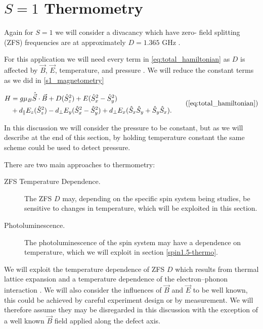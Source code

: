 \section{$S=1$ Thermometry}
Again for $S=1$ we will consider a divacancy which have zero-
field splitting (ZFS) frequencies are at approximately
$D = 1.365$ GHz \cite{Falk2013}.

For this application we will need every term in \eqref{eq:total_hamiltonian} as $D$ is affected by $\vec{B}$, $\vec{E}$, temperature, and pressure \cite{Fujiwara2021}. We will reduce the constant terms as we did in \ref{s1_magnetometry}

\begin{equation}
	\begin{align}
		H & = g \mu_B \hat{\vec{S}}\cdot \vec{B} +
		D(\hat{S}_z^2)  + E(\hat{S}_x^2 - \hat{S}_y^2) \\
		  & +d_\parallel E_z(\hat{S}_z^2)
		- d_\perp  E_y(\hat{S}_x^2 - \hat{S}_y^2   ) + d_\perp E_x(\hat{S}_x\hat{S}_y + \hat{S}_y\hat{S}_x).
	\end{align}
	\tag{\ref{eq:total_hamiltonian}}
\end{equation}

In this discussion we will consider the pressure to be constant, but as we will describe at the end of this section, by holding temperature constant the same scheme could be used to detect pressure.

There are two main approaches to thermometry:
\begin{description}
	\item[ZFS Temperature Dependence.] The ZFS $D$ may, depending on the specific spin system being studies, be sensitive to changes in temperature, which will be exploited in this section.
    \item[Photoluminescence.] The photoluminescence of the spin system may have a dependence on temperature, which we will exploit in section \ref{spin1.5-thermo}.
\end{description}

We will exploit the temperature dependence of ZFS $D$ which results
from thermal lattice expansion and a temperature dependence of the electron–phonon interaction \cite{PhysRevB.90.235205,PhysRevB.90.041201}. We will also consider the influences of $\vec{B}$ and $\vec{E}$ to be well known, this could be achieved by careful experiment design or by measurement. We will therefore assume they may be disregarded in this discussion with the exception of a well known $\vec{B}$ field applied along the defect axis.

